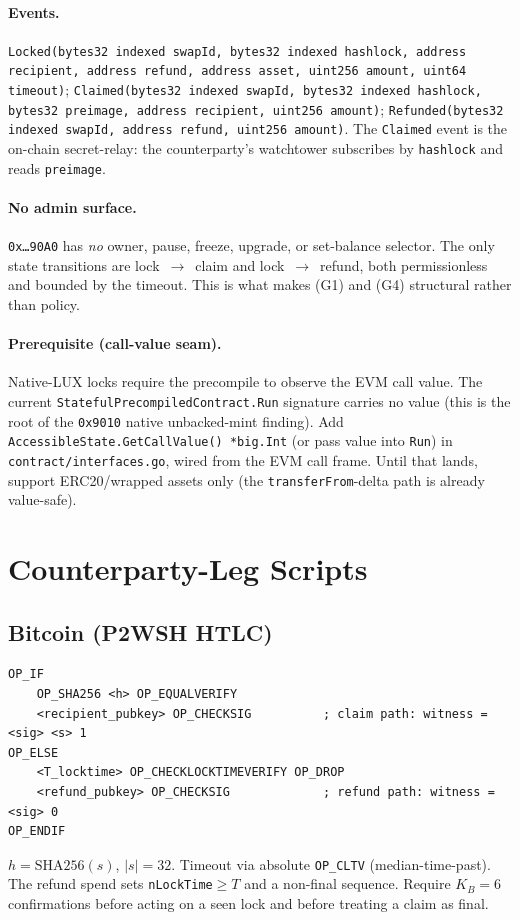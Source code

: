 \documentclass[11pt]{article}
\begin{document}
\paragraph{Events.}
\texttt{Locked(bytes32 indexed swapId, bytes32 indexed hashlock, address
recipient, address refund, address asset, uint256 amount, uint64 timeout)};
\texttt{Claimed(bytes32 indexed swapId, bytes32 indexed hashlock, bytes32
preimage, address recipient, uint256 amount)};
\texttt{Refunded(bytes32 indexed swapId, address refund, uint256 amount)}.
The \texttt{Claimed} event is the on-chain secret-relay: the counterparty's
watchtower subscribes by \texttt{hashlock} and reads \texttt{preimage}.

\paragraph{No admin surface.} \texttt{0x{\dots}90A0} has \emph{no} owner, pause,
freeze, upgrade, or set-balance selector. The only state transitions are
lock~$\to$~claim and lock~$\to$~refund, both permissionless and bounded by the
timeout. This is what makes (G1) and (G4) structural rather than policy.

\paragraph{Prerequisite (call-value seam).} Native-LUX locks require the
precompile to observe the EVM call value. The current
\texttt{StatefulPrecompiledContract.Run} signature carries no value (this is the
root of the \texttt{0x9010} native unbacked-mint finding). Add
\texttt{AccessibleState.GetCallValue() *big.Int} (or pass value into \texttt{Run})
in \texttt{contract/interfaces.go}, wired from the EVM call frame. Until that
lands, support ERC20/wrapped assets only (the \texttt{transferFrom}-delta path is
already value-safe).

\section{Counterparty-Leg Scripts}

\subsection{Bitcoin (P2WSH HTLC)}
\begin{lstlisting}
OP_IF
    OP_SHA256 <h> OP_EQUALVERIFY
    <recipient_pubkey> OP_CHECKSIG          ; claim path: witness = <sig> <s> 1
OP_ELSE
    <T_locktime> OP_CHECKLOCKTIMEVERIFY OP_DROP
    <refund_pubkey> OP_CHECKSIG             ; refund path: witness = <sig> 0
OP_ENDIF
\end{lstlisting}
$h=\mathrm{SHA256}(s)$, $|s|=32$. Timeout via absolute \texttt{OP\_CLTV}
(median-time-past). The refund spend sets \texttt{nLockTime}$\ge T$ and a
non-final sequence. Require $K_B=6$ confirmations before acting on a seen lock
and before treating a claim as final.
\end{document}
